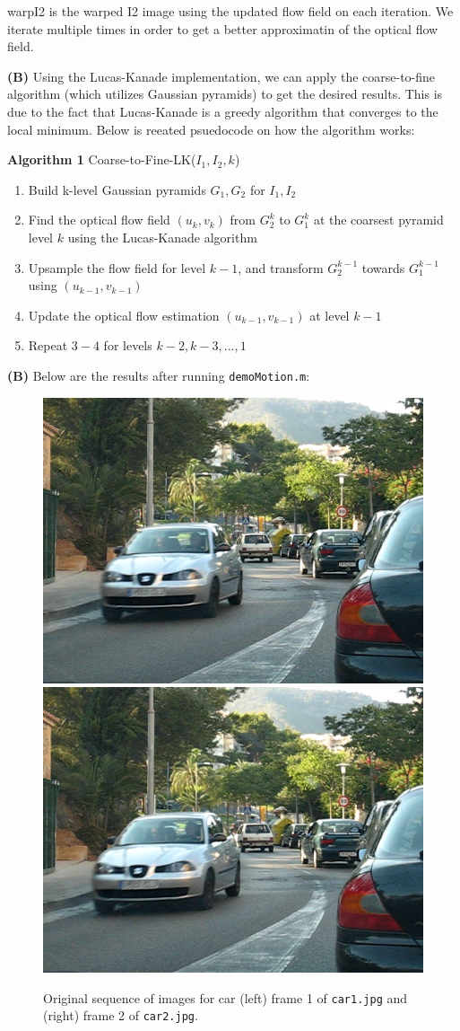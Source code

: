 \documentclass[12pt,twoside]{article}
\begin{document}
warpI2 is the warped I2 image using the updated flow field on each iteration.  We iterate multiple times in order to get a better approximatin of the optical flow field.
\newline

\textbf{(B)} Using the Lucas-Kanade implementation, we can apply the coarse-to-fine algorithm (which utilizes Gaussian pyramids) to get the desired results.  This is due to the fact that Lucas-Kanade is a greedy algorithm that converges to the local minimum.  Below is reeated psuedocode on how the algorithm works:\newline\newline

\textbf{Algorithm 1} Coarse-to-Fine-LK($I_{1}, I_{2},k$)
\begin{enumerate}
 \item Build k-level Gaussian pyramids $G_{1}, G_{2}$ for $I_{1}, I_{2}$
 \item Find the optical flow field $(u_{k}, v_{k})$ from $G_{2}^{k}$ to $G_{1}^{k}$ at the coarsest pyramid level $k$ using the Lucas-Kanade algorithm
 \item Upsample the flow field for level $k-1$, and transform $G_{2}^{k-1}$ towards $G_{1}^{k-1}$ using $(u_{k-1}, v_{k-1})$
 \item Update the optical flow estimation $(u_{k-1}, v_{k-1})$ at level $k-1$
 \item Repeat $3-4$ for levels $k-2, k-3, . . . , 1$\newline
 \end{enumerate}

 \textbf{(B)} Below are the results after running \texttt{demoMotion.m}:\newline

\begin{figure}[h]
  \begin{center}
    \includegraphics[width=0.4\linewidth, trim= 0pt 80pt 0pt 80pt, clip]{car1.jpg}
    \includegraphics[width=0.4\linewidth, trim= 0pt 80pt 0pt 80pt, clip]{car2.jpg}

  \end{center}
  \caption{Original sequence of images for car (left) frame 1 of \texttt{car1.jpg} and (right) frame 2 of \texttt{car2.jpg}.}
  \label{fig:pipeline}
\end{figure}
\end{document}
